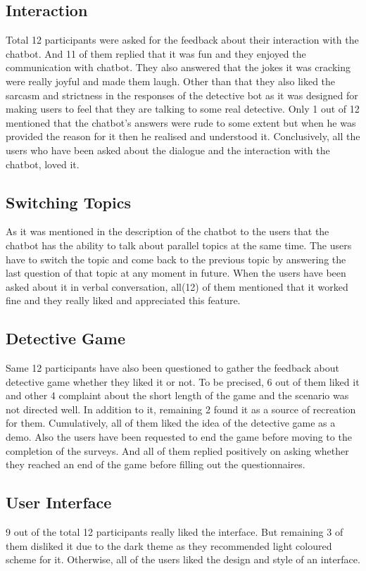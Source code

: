 \subsection{Interaction}
Total 12 participants were asked for the feedback about their interaction with the chatbot. And 11 of them replied that it was fun and they enjoyed the communication with chatbot. They also answered that the jokes it was cracking were really joyful and made them laugh. Other than that they also liked the sarcasm and strictness in the responses of the detective bot as it was designed for making users to feel that they are talking to some real detective. Only 1 out of 12 mentioned that the chatbot's answers were rude to some extent but when he was provided the reason for it then he realised and understood it. Conclusively, all the users who have been asked about the dialogue and the interaction with the chatbot, loved it.

\subsection{Switching Topics}
As it was mentioned in the description of the chatbot to the users that the chatbot has the ability to talk about parallel topics at the same time. The users have to switch the topic and come back to the previous topic by answering the last question of that topic at any moment in future. When the users have been asked about it in verbal conversation, all(12) of them mentioned that it worked fine and they really liked and appreciated this feature.

\subsection{Detective Game}
Same 12 participants have also been questioned to gather the feedback about detective game whether they liked it or not. To be precised, 6 out of them liked it and other 4 complaint about the short length of the game and the scenario was not directed well. In addition to it, remaining 2 found it as a source of recreation for them. Cumulatively, all of them liked the idea of the detective game as a demo. Also the users have been requested to end the game before moving to the completion of the surveys. And all of them replied positively on asking whether they reached an end of the game before filling out the questionnaires.

\subsection{User Interface}
9 out of the total 12 participants really liked the interface. But remaining 3 of them disliked it due to the dark theme as they recommended light coloured scheme for it. Otherwise, all of the users liked the design and style of an interface.  


